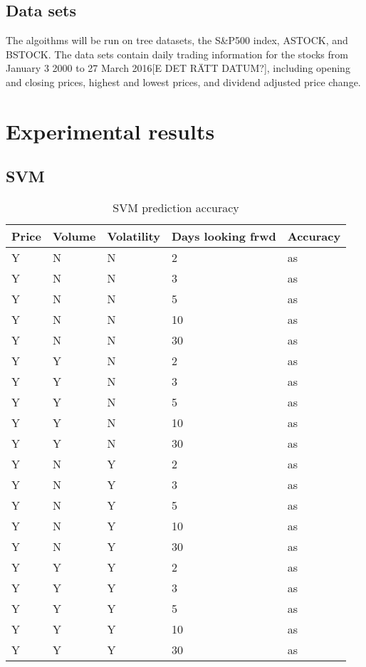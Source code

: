 \documentclass{article}
\begin{document}
\subsection{Data sets}
The algoithms will be run on tree datasets, the S\&P500 index, ASTOCK, and BSTOCK. The data sets contain daily trading information for the stocks from January 3 2000 to 27 March 2016[E DET R\"ATT DATUM?], including opening and closing prices, highest and lowest prices, and dividend adjusted price change. 

\newpage

\section{Experimental results}

\subsection{SVM}
\begin{table}[h]
\begin{center}
    \begin{tabular}{ | l | l |  l | l |  p{3cm} |}
    \hline
    Price & Volume & Volatility & Days looking frwd & Accuracy \\ \hline
    Y & N & N & 2 & as\\ \hline
    Y & N & N & 3 & as\\ \hline
    Y & N & N & 5 & as\\ \hline
    Y & N & N & 10 & as\\ \hline
    Y & N & N & 30 & as\\ \hline
    Y & Y & N & 2 & as\\ \hline
    Y & Y & N & 3 & as\\ \hline
    Y & Y & N & 5 & as\\ \hline
    Y & Y & N & 10 & as\\ \hline
    Y & Y & N & 30 & as\\ \hline
    Y & N & Y & 2 & as\\ \hline
    Y & N & Y & 3 & as\\ \hline
    Y & N & Y & 5 & as\\ \hline
    Y & N & Y & 10 & as\\ \hline
    Y & N & Y & 30 & as\\ \hline
    Y & Y & Y & 2 & as\\ \hline
    Y & Y & Y & 3 & as\\ \hline
    Y & Y & Y & 5 & as\\ \hline
    Y & Y & Y & 10 & as\\ \hline
    Y & Y & Y & 30 & as\\ 
    \hline
    \end{tabular}
\caption{SVM prediction accuracy}
\end{center}
\end{table}
\end{document}
